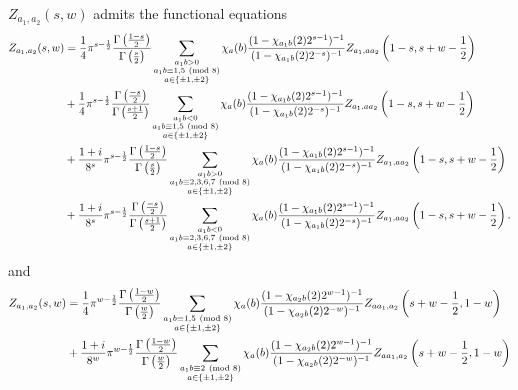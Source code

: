 \documentclass[12pt,reqno,oneside]{amsart}
\begin{document}
    \begin{theorem}\label{thm:double_Dirichlet_series_functional_equation}
        $Z_{a_{1},a_{2}}(s,w)$ admits the functional equations
        \begin{align*}
            Z_{a_{1},a_{2}}(s,w) &= \frac{1}{4}\pi^{s-\frac{1}{2}}\frac{\Gamma\left(\frac{1-s}{2}\right)}{\Gamma\left(\frac{s}{2}\right)}\sum_{\substack{a_{1}b > 0 \\ a_{1}b \equiv 1,5 \ \left(\text{mod }8\right) \\ a \in \{\pm1,\pm2\}}}\chi_{a}(b)\frac{(1-\chi_{a_{1}b}(2)2^{s-1})^{-1}}{(1-\chi_{a_{1}b}(2)2^{-s})^{-1}}Z_{a_{1},aa_{2}}\left(1-s,s+w-\frac{1}{2}\right) \\
            &+\frac{1}{4}\pi^{s-\frac{1}{2}}\frac{\Gamma\left(\frac{-s}{2}\right)}{\Gamma\left(\frac{s+1}{2}\right)}\sum_{\substack{a_{1}b < 0 \\ a_{1}b \equiv 1,5 \ \left(\text{mod }8\right) \\ a \in \{\pm1,\pm2\}}}\chi_{a}(b)\frac{(1-\chi_{a_{1}b}(2)2^{s-1})^{-1}}{(1-\chi_{a_{1}b}(2)2^{-s})^{-1}}Z_{a_{1},aa_{2}}\left(1-s,s+w-\frac{1}{2}\right) \\
            &+\frac{1+i}{8^{s}}\pi^{s-\frac{1}{2}}\frac{\Gamma\left(\frac{1-s}{2}\right)}{\Gamma\left(\frac{s}{2}\right)}\sum_{\substack{a_{1}b > 0 \\ a_{1}b \equiv 2,3,6,7 \ \left(\text{mod }8\right) \\ a \in \{\pm1,\pm2\}}}\chi_{a}(b)\frac{(1-\chi_{a_{1}b}(2)2^{s-1})^{-1}}{(1-\chi_{a_{1}b}(2)2^{-s})^{-1}}Z_{a_{1},aa_{2}}\left(1-s,s+w-\frac{1}{2}\right) \\
            &+\frac{1+i}{8^{s}}\pi^{s-\frac{1}{2}}\frac{\Gamma\left(\frac{-s}{2}\right)}{\Gamma\left(\frac{s+1}{2}\right)}\sum_{\substack{a_{1}b < 0 \\ a_{1}b \equiv 2,3,6,7 \ \left(\text{mod }8\right) \\ a \in \{\pm1,\pm2\}}}\chi_{a}(b)\frac{(1-\chi_{a_{1}b}(2)2^{s-1})^{-1}}{(1-\chi_{a_{1}b}(2)2^{-s})^{-1}}Z_{a_{1},aa_{2}}\left(1-s,s+w-\frac{1}{2}\right).
        \end{align*}
        and
        \begin{align*}
            Z_{a_{1},a_{2}}(s,w) &= \frac{1}{4}\pi^{w-\frac{1}{2}}\frac{\G\left(\frac{1-w}{2}\right)}{\G\left(\frac{w}{2}\right)}\sum_{\substack{a_{1}b \equiv 1,5 \tmod{8} \\ a \in \{\pm1,\pm2\}}}\chi_{a}(b)\frac{(1-\chi_{a_{2}b}(2)2^{w-1})^{-1}}{(1-\chi_{a_{2}b}(2)2^{-w})^{-1}}Z_{aa_{1},a_{2}}\left(s+w-\frac{1}{2},1-w\right) \\
            &+\frac{1+i}{8^{w}}\pi^{w-\frac{1}{2}}\frac{\G\left(\frac{1-w}{2}\right)}{\G\left(\frac{w}{2}\right)}\sum_{\substack{a_{1}b \equiv 2 \tmod{8} \\ a \in \{\pm1,\pm2\}}}\chi_{a}(b)\frac{(1-\chi_{a_{2}b}(2)2^{w-1})^{-1}}{(1-\chi_{a_{2}b}(2)2^{-w})^{-1}}Z_{aa_{1},a_{2}}\left(s+w-\frac{1}{2},1-w\right) \\

\end{align*}
\end{theorem}
\end{document}
